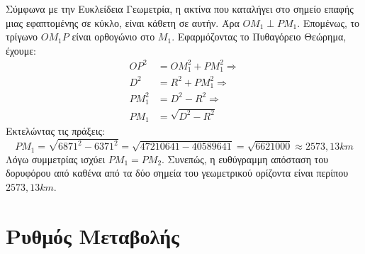 \begin{alist}
\item Σύμφωνα με την Ευκλείδεια Γεωμετρία, η ακτίνα που καταλήγει στο σημείο επαφής μιας εφαπτομένης σε κύκλο, είναι κάθετη σε αυτήν. Άρα $OM_1 \perp PM_1$.
Επομένως, το τρίγωνο $ OM_1P$ είναι ορθογώνιο στο $M_1$. 
Εφαρμόζοντας το Πυθαγόρειο Θεώρημα, έχουμε:
\begin{align*}
    OP^2 &= OM_1^2 + PM_1^2 \Rightarrow \\
    D^2 &= R^2 + PM_1^2 \Rightarrow \\
    PM_1^2 &= D^2 - R^2 \Rightarrow \\
    PM_1 &= \sqrt{D^2-R^2}
\end{align*}
Εκτελώντας τις πράξεις:
\[PM_1 = \sqrt{6871^2-6371^2} = \sqrt{47210641 - 40589641} = \sqrt{6621000} \approx 2573{,}13\si{km}\]
Λόγω συμμετρίας ισχύει $PM_1 = PM_2$. Συνεπώς, η ευθύγραμμη απόσταση του δορυφόρου από καθένα από τα δύο σημεία του γεωμετρικού ορίζοντα είναι περίπου $2573{,}13\si{km}$.
\end{alist}

\section{Ρυθμός Μεταβολής}

\lysh

